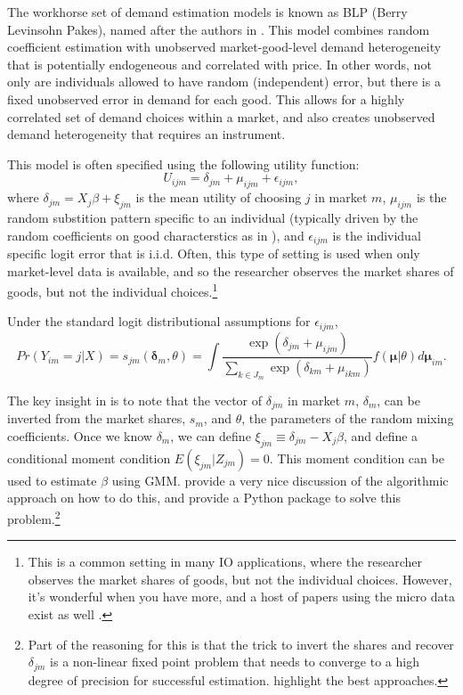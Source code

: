 \documentclass{tufte-handout}
\theoremstyle{break}
\begin{document}
The workhorse set of demand estimation models is known as BLP (Berry  Levinsohn Pakes), named after the authors in \citet{berry1995automobile}. This model combines random coefficient estimation with unobserved market-good-level demand heterogeneity that is potentially endogeneous and correlated with price. In other words, not only are individuals allowed to have random (independent) error, but there is a fixed unobserved error in demand for each good. This allows for a highly correlated set of demand choices within a market, and also creates unobserved demand heterogeneity that requires an instrument.

This model is often specified using the following utility function:          
\begin{equation}
  U_{ijm} =\delta_{jm}  +  \mu_{ijm} + \epsilon_{ijm}, 
\end{equation}
where $\delta_{jm} = X_{j}\beta + \xi_{jm}$ is the mean utility of choosing $j$ in market $m$, $\mu_{ijm}$ is the random substition pattern specific to an individual (typically driven by the random coefficients on good characterstics as in ),  and $\epsilon_{ijm}$ is the individual specific logit error that is i.i.d. Often, this type of setting is used when only market-level data is available, and so the researcher observes the market shares of goods, but not the individual choices.\footnote{This is a common setting in many IO applications, where the researcher observes the market shares of goods, but not the individual choices. However, it's wonderful when you have more, and a host of papers using the micro data exist as well \citep{berry2004differentiated, conlon2023incorporating}.}

Under the standard logit distributional assumptions for $\epsilon_{ijm}$,
\begin{equation}
  Pr(Y_{im} = j | X) = s_{jm}(\boldsymbol{\delta}_{m}, \theta) = \int \frac{\exp(\delta_{jm} + \mu_{ijm})}{\sum_{k \in J_{m}} \exp(\delta_{km} + \mu_{ikm})} f(\boldsymbol{\mu}|\theta) d \boldsymbol{\mu}_{im}.
\end{equation}

The key insight in \citet{berry1995automobile} is to note that the vector of $\delta_{jm}$ in market $m$, $\delta_{m}$, can be inverted from the market shares, $s_{m}$, and $\theta$, the parameters of the random mixing coefficients. Once we know $\delta_{m}$, we can define $\xi_{jm} \equiv \delta_{jm} - X_{j}\beta$, and define a conditional moment condition $E(\xi_{jm} | Z_{jm}) = 0$. This moment condition can be used to estimate $\beta$ using GMM. \citet{conlon2020best} provide a very nice discussion of the algorithmic approach on how to do this, and provide a Python package to solve this problem.\footnote{Part of the reasoning for this is that the trick to invert the shares and recover $\delta_{jm}$ is a non-linear fixed point problem that needs to converge to a high degree of precision for successful estimation. \citet{conlon2020best} highlight the best approaches.} 
\end{document}
